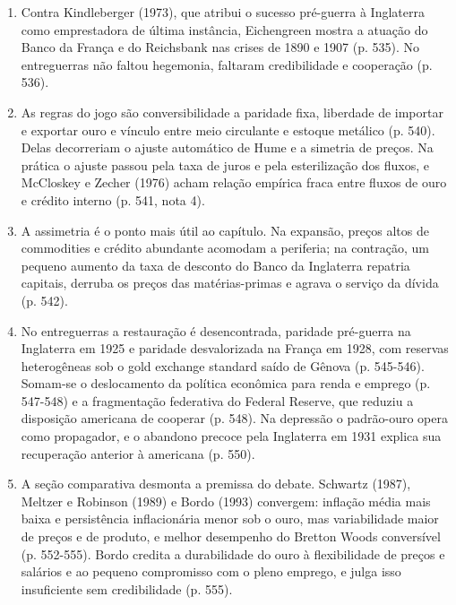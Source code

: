 \begin{enumerate}
\item Contra Kindleberger (1973), que atribui o sucesso pré-guerra à Inglaterra
como emprestadora de última instância, Eichengreen mostra a atuação do Banco da
França e do Reichsbank nas crises de 1890 e 1907 (p. 535). No entreguerras não
faltou hegemonia, faltaram credibilidade e cooperação (p. 536).

\item As regras do jogo são conversibilidade a paridade fixa, liberdade de
importar e exportar ouro e vínculo entre meio circulante e estoque metálico
(p. 540). Delas decorreriam o ajuste automático de Hume e a simetria de preços.
Na prática o ajuste passou pela taxa de juros e pela esterilização dos fluxos, e
McCloskey e Zecher (1976) acham relação empírica fraca entre fluxos de ouro e
crédito interno (p. 541, nota 4).

\item A assimetria é o ponto mais útil ao capítulo. Na expansão, preços altos de
commodities e crédito abundante acomodam a periferia; na contração, um pequeno
aumento da taxa de desconto do Banco da Inglaterra repatria capitais, derruba os
preços das matérias-primas e agrava o serviço da dívida (p. 542).


\item No entreguerras a restauração é desencontrada, paridade pré-guerra na
Inglaterra em 1925 e paridade desvalorizada na França em 1928, com reservas
heterogêneas sob o gold exchange standard saído de Gênova (p. 545-546). Somam-se
o deslocamento da política econômica para renda e emprego (p. 547-548) e a
fragmentação federativa do Federal Reserve, que reduziu a disposição americana de
cooperar (p. 548). Na depressão o padrão-ouro opera como propagador, e o abandono
precoce pela Inglaterra em 1931 explica sua recuperação anterior à americana
(p. 550).

\item A seção comparativa desmonta a premissa do debate. Schwartz (1987), Meltzer
e Robinson (1989) e Bordo (1993) convergem: inflação média mais baixa e
persistência inflacionária menor sob o ouro, mas variabilidade maior de preços e
de produto, e melhor desempenho do Bretton Woods conversível (p. 552-555). Bordo
credita a durabilidade do ouro à flexibilidade de preços e salários e ao pequeno
compromisso com o pleno emprego, e julga isso insuficiente sem credibilidade
(p. 555).
\end{enumerate}

